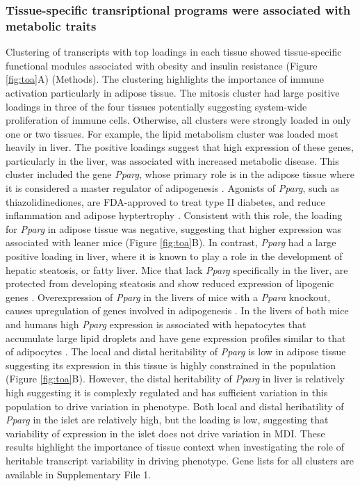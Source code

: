 \documentclass[
]{article}
\begin{document}
\subsubsection{Tissue-specific transriptional programs were associated
with metabolic
traits}\label{tissue-specific-transriptional-programs-were-associated-with-metabolic-traits}

Clustering of transcripts with top loadings in each tissue showed
tissue-specific functional modules associated with obesity and insulin
resistance (Figure \ref{fig:toa}A) (Methods). The clustering highlights
the importance of immune activation particularly in adipose tissue. The
mitosis cluster had large positive loadings in three of the four tissues
potentially suggesting system-wide proliferation of immune cells.
Otherwise, all clusters were strongly loaded in only one or two tissues.
For example, the lipid metabolism cluster was loaded most heavily in
liver. The positive loadings suggest that high expression of these
genes, particularly in the liver, was associated with increased
metabolic disease. This cluster included the gene \textit{Pparg}, whose
primary role is in the adipose tissue where it is considered a master
regulator of adipogenesis \cite{pmid17389767}. Agonists of
\textit{Pparg}, such as thiazolidinediones, are FDA-approved to treat
type II diabetes, and reduce inflammation and adipose hyptertrophy
\cite{pmid17389767}. Consistent with this role, the loading for
\textit{Pparg} in adipose tissue was negative, suggesting that higher
expression was associated with leaner mice (Figure \ref{fig:toa}B). In
contrast, \textit{Pparg} had a large positive loading in liver, where it
is known to play a role in the development of hepatic steatosis, or
fatty liver. Mice that lack \textit{Pparg} specifically in the liver,
are protected from developing steatosis and show reduced expression of
lipogenic genes \cite{pmid12805374, pmid12618528}. Overexpression of
\textit{Pparg} in the livers of mice with a \textit{Ppara} knockout,
causes upregulation of genes involved in adipogenesis
\cite{pmid16357043}. In the livers of both mice and humans high
\textit{Pparg} expression is associated with hepatocytes that accumulate
large lipid droplets and have gene expression profiles similar to that
of adipocytes \cite{pmid15644454, pmid16403437}. The local and distal
heritability of \textit{Pparg} is low in adipose tissue suggesting its
expression in this tissue is highly constrained in the population
(Figure \ref{fig:toa}B). However, the distal heritability of
\textit{Pparg} in liver is relatively high suggesting it is complexly
regulated and has sufficient variation in this population to drive
variation in phenotype. Both local and distal heribatility of
\textit{Pparg} in the islet are relatively high, but the loading is low,
suggesting that variability of expression in the islet does not drive
variation in MDI. These results highlight the importance of tissue
context when investigating the role of heritable transcript variability
in driving phenotype. Gene lists for all clusters are available in
Supplementary File 1.
\end{document}
